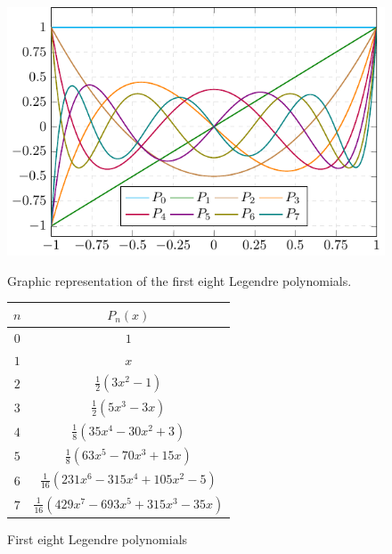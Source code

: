 \documentclass[../main.tex]{subfiles}
\begin{document}
\begin{figure}[htbp]
  \centering
  \begin{minipage}[ht]{0.45\textwidth}
    \centering
    \includegraphics[width=\textwidth]{Images/legendre.pdf}
    \caption{Graphic representation of the first eight Legendre polynomials.}
  \end{minipage}
  \hfill
  \begin{minipage}[ht]{0.45\textwidth}
    \centering
    \captionsetup{type=table} %
    \begin{tabular}{c|c}
      $n$ & $P_n(x)$                                 \\
      \hline\hline
      $0$ & $1$                                      \\
      $1$ & $x$                                      \\
      $2$ & $\frac{1}{2}(3x^2-1)$                    \\
      $3$ & $\frac{1}{2}(5x^3-3x)$                   \\
      $4$ & $\frac{1}{8}(35x^4-30x^2+3)$             \\
      $5$ & $\frac{1}{8}(63x^5-70x^3+15x)$           \\
      $6$ & $\frac{1}{16}(231x^6-315x^4+105x^2-5)$   \\
      $7$ & $\frac{1}{16}(429x^7-693x^5+315x^3-35x)$ \\
    \end{tabular}
    \caption{First eight Legendre polynomials}
    \label{tab:legendre_polys}
  \end{minipage}
\end{figure}
\end{document}

